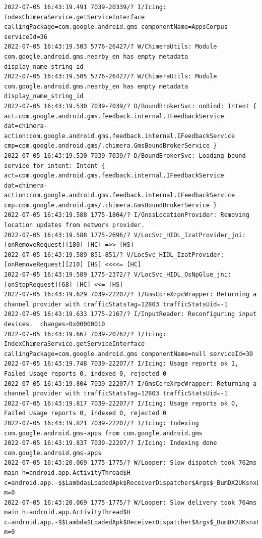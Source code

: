 \documentclass[a4paper,12pt]{book}
\begin{document}
\begin{lstlisting}
2022-07-05 16:43:19.491 7039-20339/? I/Icing: IndexChimeraService.getServiceInterface callingPackage=com.google.android.gms componentName=AppsCorpus serviceId=36
2022-07-05 16:43:19.503 5776-26427/? W/ChimeraUtils: Module com.google.android.gms.nearby_en has empty metadata display_name_string_id
2022-07-05 16:43:19.505 5776-26427/? W/ChimeraUtils: Module com.google.android.gms.nearby_en has empty metadata display_name_string_id
2022-07-05 16:43:19.530 7039-7039/? D/BoundBrokerSvc: onBind: Intent { act=com.google.android.gms.feedback.internal.IFeedbackService dat=chimera-action:com.google.android.gms.feedback.internal.IFeedbackService cmp=com.google.android.gms/.chimera.GmsBoundBrokerService }
2022-07-05 16:43:19.530 7039-7039/? D/BoundBrokerSvc: Loading bound service for intent: Intent { act=com.google.android.gms.feedback.internal.IFeedbackService dat=chimera-action:com.google.android.gms.feedback.internal.IFeedbackService cmp=com.google.android.gms/.chimera.GmsBoundBrokerService }
2022-07-05 16:43:19.588 1775-1804/? I/GnssLocationProvider: Removing location updates from network provider.
2022-07-05 16:43:19.588 1775-2696/? V/LocSvc_HIDL_IzatProvider_jni: [onRemoveRequest][180] [HC] =>> [HS]
2022-07-05 16:43:19.589 851-851/? V/LocSvc_HIDL_IzatProvider: [onRemoveRequest][210] [HS] <<<<= [HC]
2022-07-05 16:43:19.589 1775-2372/? V/LocSvc_HIDL_OsNpGlue_jni: [onStopRequest][68] [HC] <<= [HS]
2022-07-05 16:43:19.629 7039-22207/? I/GmsCoreXrpcWrapper: Returning a channel provider with trafficStatsTag=12803 trafficStatsUid=-1
2022-07-05 16:43:19.633 1775-2167/? I/InputReader: Reconfiguring input devices.  changes=0x00000010
2022-07-05 16:43:19.667 7039-20762/? I/Icing: IndexChimeraService.getServiceInterface callingPackage=com.google.android.gms componentName=null serviceId=30
2022-07-05 16:43:19.748 7039-22207/? I/Icing: Usage reports ok 1, Failed Usage reports 0, indexed 0, rejected 0
2022-07-05 16:43:19.804 7039-22207/? I/GmsCoreXrpcWrapper: Returning a channel provider with trafficStatsTag=12803 trafficStatsUid=-1
2022-07-05 16:43:19.817 7039-22207/? I/Icing: Usage reports ok 0, Failed Usage reports 0, indexed 0, rejected 0
2022-07-05 16:43:19.821 7039-22207/? I/Icing: Indexing com.google.android.gms-apps from com.google.android.gms
2022-07-05 16:43:19.837 7039-22207/? I/Icing: Indexing done com.google.android.gms-apps
2022-07-05 16:43:20.069 1775-1775/? W/Looper: Slow dispatch took 762ms main h=android.app.ActivityThread$H c=android.app.-$$Lambda$LoadedApk$ReceiverDispatcher$Args$_BumDX2UKsnxLVrE6UJsJZkotuA@79b084c m=0
2022-07-05 16:43:20.069 1775-1775/? W/Looper: Slow delivery took 764ms main h=android.app.ActivityThread$H c=android.app.-$$Lambda$LoadedApk$ReceiverDispatcher$Args$_BumDX2UKsnxLVrE6UJsJZkotuA@d8835aa m=0

\end{lstlisting}
\end{document}
